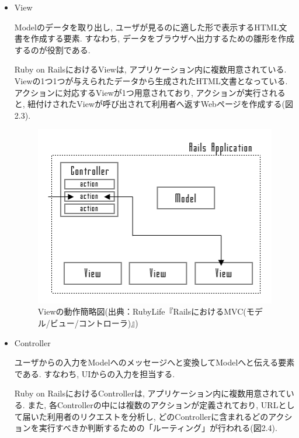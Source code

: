 \begin{description}
\begin{itemize}
\item View

Modelのデータを取り出し, ユーザが見るのに適した形で表示するHTML文書を作成する要素.
すなわち, データをブラウザへ出力するための雛形を作成するのが役割である.

Ruby on RailsにおけるViewは, アプリケーション内に複数用意されている.
Viewの1つ1つが与えられたデータから生成されたHTML文書となっている.
アクションに対応するViewが1つ用意されており, アクションが実行されると, 紐付けされたViewが呼び出されて利用者へ返すWebページを作成する(図2.3).

\begin{figure}
\begin{center}
\includegraphics[width=14cm]{fig/view.png}
\caption{Viewの動作簡略図(出典：RubyLife『RailsにおけるMVC(モデル/ビュー/コントローラ)』)}
\end{center}
\end{figure}

\item Controller

ユーザからの入力をModelへのメッセージへと変換してModelへと伝える要素である.
すなわち, UIからの入力を担当する.

Ruby on RailsにおけるControllerは, アプリケーション内に複数用意されている.
また, 各Controllerの中には複数のアクションが定義されており, URLとして届いた利用者のリクエストを分析し, どのControllerに含まれるどのアクションを実行すべきか判断するための「ルーティング」が行われる(図2.4).


\end{itemize}
\end{description}
